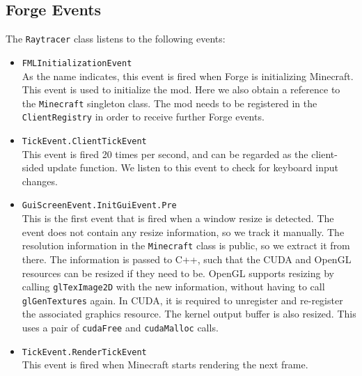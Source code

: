 \documentclass[]{article}
\begin{document}
\subsection{Forge Events}
The \texttt{Raytracer} class listens to the following events:
\begin{itemize}
  \item \texttt{FMLInitializationEvent} \\
    As the name indicates, this event is fired when Forge is initializing Minecraft.
    This event is used to initialize the mod.
    Here we also obtain a reference to the \texttt{Minecraft} singleton class.
    The mod needs to be registered in the \texttt{ClientRegistry} in order to receive further Forge events.
  \item \texttt{TickEvent.ClientTickEvent} \\
    This event is fired 20 times per second, and can be regarded as the client-sided update function.
    We listen to this event to check for keyboard input changes.
  \item \texttt{GuiScreenEvent.InitGuiEvent.Pre} \\
    This is the first event that is fired when a window resize is detected.
    The event does not contain any resize information, so we track it manually.
    The resolution information in the \texttt{Minecraft} class is public, so we extract it from there.
    The information is passed to C++, such that the CUDA and OpenGL resources can be resized if they need to be.
    OpenGL supports resizing by calling \texttt{glTexImage2D} with the new information, without having to call \texttt{glGenTextures} again.
    In CUDA, it is required to unregister and re-register the associated graphics resource.
    The kernel output buffer is also resized. This uses a pair of \texttt{cudaFree} and \texttt{cudaMalloc} calls.

  \item \texttt{TickEvent.RenderTickEvent} \\
    This event is fired when Minecraft starts rendering the next frame.
    

\end{itemize}
\end{document}
